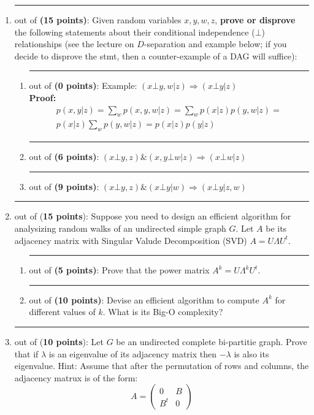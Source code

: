 \documentclass{article}%
\begin{document}
\begin{enumerate}
\item \rule{0.5 in}{1 pt} out of \textbf{(15 points)}: Given random variables $x, y, w, z$, \textbf{prove or disprove} the following statements about their conditional independence ($\bot$) relationships (see the lecture on $D$-separation and example below; if you decide to disprove the stmt, then a counter-example of a DAG will suffice):
	\begin{enumerate}
	\item \rule{0.5 in}{1 pt} out of \textbf{(0 points)}: Example: $(x \bot y, w | z) \Longrightarrow (x \bot y | z)$\\
	\textbf{Proof:} 
\[\begin{array}{l}
p(x,y | z) = \sum\limits_w {p(x,y,w|z) = } \sum\limits_w {p(x|z)p(y,w|z) = } \\
p(x|z)\sum\limits_w {p(y,w|z) = } p(x|z)p(y|z)
\end{array}\]

	\item \rule{0.5 in}{1 pt} out of \textbf{(6 points)}: $(x \bot y, z) \& (x, y \bot w | z) \Longrightarrow (x \bot w | z)$\\
	
	\item \rule{0.5 in}{1 pt} out of \textbf{(9 points)}: $(x \bot y, z) \& (x \bot y | w) \Longrightarrow (x \bot y | z, w)$\\
	
	\end{enumerate}

	
  \item \rule{0.5 in}{1 pt} out of (\textbf{15 points}): Suppose you need to design an efficient algorithm for analysizing random walks of an undirected simple graph $G$. Let $A$ be its adjacency matrix with Singular Valude Decomposition (SVD) $A=U\Lambda{U^t}$.
		\begin{enumerate}
		\item \rule{0.5 in}{1 pt} out of \textbf{(5 points)}: Prove that the power matrix ${A^k} = U{\Lambda^k}{U^t}$. \\
		
		\item \rule{0.5 in}{1 pt} out of \textbf{(10 points)}: Devise an efficient algorithm to compute $A^k$ for different values of $k$. What is its Big-O complexity?
		\end{enumerate}
			
  \item \rule{0.5 in}{1 pt} out of (\textbf{10 points}): Let $G$ be an undirected complete bi-partitie graph. Prove that if $\lambda$ is an eigenvalue of its adjacency matrix then $-\lambda$ is also its eigenvalue. Hint: Assume that after the permutation of rows and columns, the adjacency matrux is of the form:
	\[A = \left( {\begin{array}{*{20}{c}}
	0&B\\
	{{B^t}}&0
	\end{array}} \right)\]
	


\end{enumerate}
\end{document}

